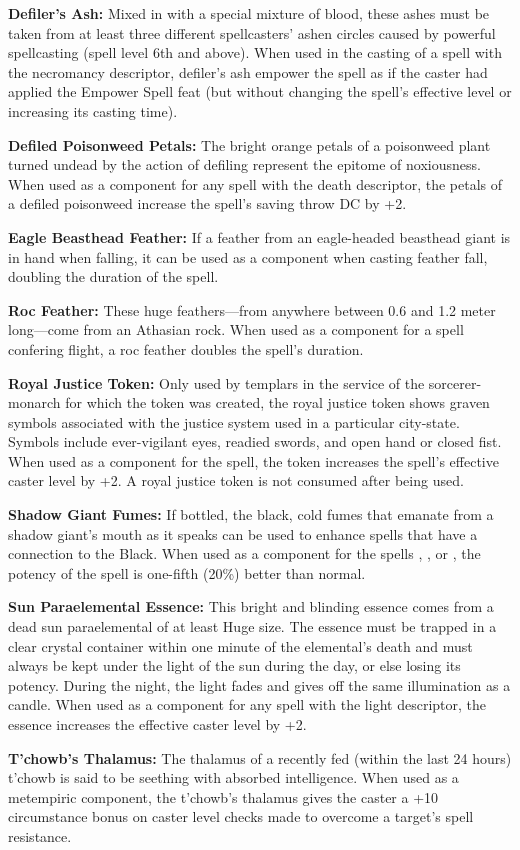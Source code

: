 \textbf{Defiler's Ash:} Mixed in with a special mixture of blood, these ashes must be taken from at least three different spellcasters' ashen circles caused by powerful spellcasting (spell level 6th and above). When used in the casting of a spell with the necromancy descriptor, defiler's ash empower the spell as if the caster had applied the Empower Spell feat (but without changing the spell's effective level or increasing its casting time).

\textbf{Defiled Poisonweed Petals:} The bright orange petals of a poisonweed plant turned undead by the action of defiling represent the epitome of noxiousness. When used as a component for any spell with the death descriptor, the petals of a defiled poisonweed increase the spell's saving throw DC by +2.

\textbf{Eagle Beasthead Feather:} If a feather from an eagle-headed beasthead giant is in hand when falling, it can be used as a component when casting feather fall, doubling the duration of the spell.

\textbf{Roc Feather:} These huge feathers---from anywhere between 0.6 and 1.2 meter long---come from an Athasian rock. When used as a component for a spell confering flight, a roc feather doubles the spell's duration.

\textbf{Royal Justice Token:} Only used by templars in the service of the sorcerer-monarch for which the token was created, the royal justice token shows graven symbols associated with the justice system used in a particular city-state. Symbols include ever-vigilant eyes, readied swords, and open hand or closed fist. When used as a component for the  spell, the token increases the spell's effective caster level by +2. A royal justice token is not consumed after being used.

\textbf{Shadow Giant Fumes:} If bottled, the black, cold fumes that emanate from a shadow giant's mouth as it speaks can be used to enhance spells that have a connection to the Black. When used as a component for the spells , , or , the potency of the spell is one-fifth (20\%) better than normal.

\textbf{Sun Paraelemental Essence:} This bright and blinding essence comes from a dead sun paraelemental of at least Huge size. The essence must be trapped in a clear crystal container within one minute of the elemental's death and must always be kept under the light of the sun during the day, or else losing its potency. During the night, the light fades and gives off the same illumination as a candle. When used as a component for any spell with the light descriptor, the essence increases the effective caster level by +2.

\textbf{T'chowb's Thalamus:} The thalamus of a recently fed (within the last 24 hours) t'chowb is said to be seething with absorbed intelligence. When used as a metempiric component, the t'chowb's thalamus gives the caster a +10 circumstance bonus on caster level checks made to overcome a target's spell resistance.